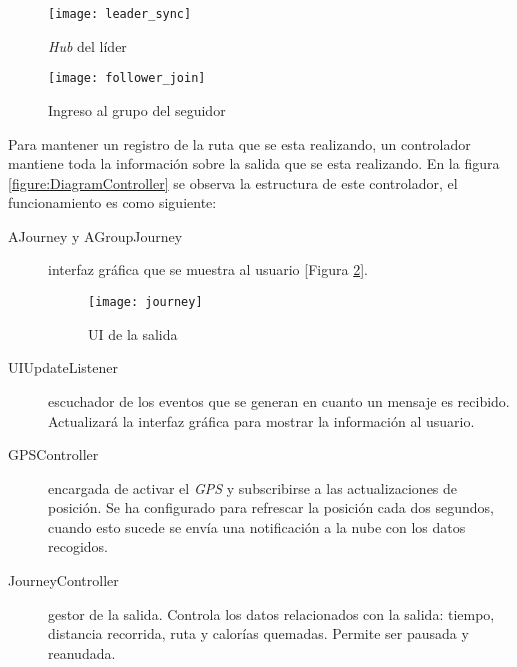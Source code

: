 \begin{figure}[H]
	\begin{minipage}{.5\textwidth}
		\begin{center}
			\texttt{[image: leader\_sync]}
			\caption{\emph{Hub} del líder}
			\label{figure:Hub}
		\end{center}
	\end{minipage}
\begin{minipage}{.5\textwidth}
	\begin{center}
		\texttt{[image: follower\_join]}
		\caption{Ingreso al grupo del seguidor}
		\label{figure:FollowerJoin}
	\end{center}
\end{minipage}
\end{figure}

Para mantener un registro de la ruta que se esta realizando, un controlador mantiene
toda la información sobre la salida que se esta realizando. En la figura
\ref{figure:DiagramController} se observa la estructura de este controlador, el
funcionamiento es como siguiente:
\begin{description}
	\item[AJourney y AGroupJourney] interfaz gráfica que se muestra al usuario
	[Figura \ref{figure:Journey}].

	\begin{figure}[H]
		\begin{center}
			\texttt{[image: journey]}
			\caption{UI de la salida}
			\label{figure:Journey}
		\end{center}
	\end{figure}

	\item[UIUpdateListener] escuchador de los eventos que se generan en cuanto un
	mensaje es recibido. Actualizará la interfaz gráfica para mostrar la información
	al usuario.

	\item[GPSController] encargada de activar el \emph{GPS} y subscribirse a las
	actualizaciones de posición. Se ha configurado para refrescar la posición cada
	dos segundos, cuando esto sucede se envía una notificación a la nube con los
	datos recogidos.

	\item[JourneyController] gestor de la salida. Controla los datos relacionados
	con la salida: tiempo, distancia recorrida, ruta y calorías quemadas. Permite
	ser pausada y reanudada.
\end{description}

